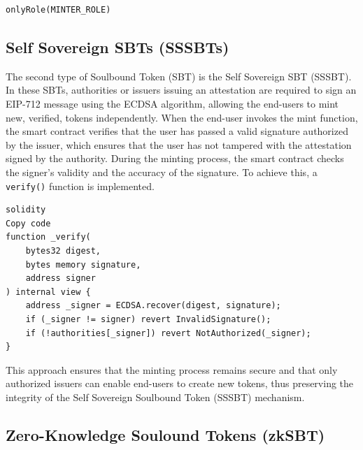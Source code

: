 \documentclass{article}
\begin{document}
\begin{verbatim}
onlyRole(MINTER_ROLE)
\end{verbatim}

\subsection{Self Sovereign SBTs (SSSBTs)}

The second type of Soulbound Token (SBT) is the Self Sovereign SBT (SSSBT). In these SBTs, authorities or issuers issuing an attestation are required to sign an EIP-712 message using the ECDSA algorithm, allowing the end-users to mint new, verified, tokens independently. When the end-user invokes the mint function, the smart contract verifies that the user has passed a valid signature authorized by the issuer, which ensures that the user has not tampered with the attestation signed by the authority. During the minting process, the smart contract checks the signer's validity and the accuracy of the signature. To achieve this, a \texttt{verify()} function is implemented.

\begin{verbatim}
solidity
Copy code
function _verify(
    bytes32 digest,
    bytes memory signature,
    address signer
) internal view {
    address _signer = ECDSA.recover(digest, signature);
    if (_signer != signer) revert InvalidSignature();
    if (!authorities[_signer]) revert NotAuthorized(_signer);
}
\end{verbatim}
This approach ensures that the minting process remains secure and that only authorized issuers can enable end-users to create new tokens, thus preserving the integrity of the Self Sovereign Soulbound Token (SSSBT) mechanism.

\subsection{Zero-Knowledge Soulound Tokens (zkSBT)}
\end{document}
